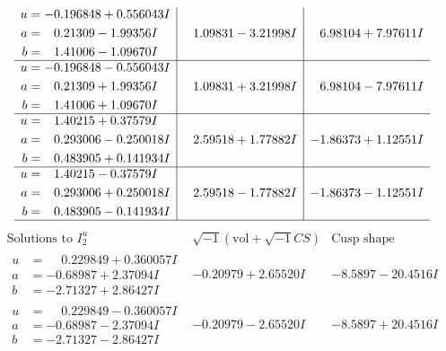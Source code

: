 \documentclass[1p]{elsarticle_modified}
\theoremstyle{definition}
\newcommand{\I}{\sqrt{-1}}
\begin{document}
$$\begin{array}{c|c|c}
\begin{aligned}
u &= -0.196848 + 0.556043 I \\
a &= \phantom{-}0.21309 - 1.99356 I \\
b &= \phantom{-}1.41006 - 1.09670 I\end{aligned}
 & \phantom{-}1.09831 - 3.21998 I & \phantom{-}6.98104 + 7.97611 I \\ \hline\begin{aligned}
u &= -0.196848 - 0.556043 I \\
a &= \phantom{-}0.21309 + 1.99356 I \\
b &= \phantom{-}1.41006 + 1.09670 I\end{aligned}
 & \phantom{-}1.09831 + 3.21998 I & \phantom{-}6.98104 - 7.97611 I \\ \hline\begin{aligned}
u &= \phantom{-}1.40215 + 0.37579 I \\
a &= \phantom{-}0.293006 - 0.250018 I \\
b &= \phantom{-}0.483905 + 0.141934 I\end{aligned}
 & \phantom{-}2.59518 + 1.77882 I & -1.86373 + 1.12551 I \\ \hline\begin{aligned}
u &= \phantom{-}1.40215 - 0.37579 I \\
a &= \phantom{-}0.293006 + 0.250018 I \\
b &= \phantom{-}0.483905 - 0.141934 I\end{aligned}
 & \phantom{-}2.59518 - 1.77882 I & -1.86373 - 1.12551 I\\
 \hline 
 \end{array}$$\newpage$$\begin{array}{c|c|c}  
\text{Solutions to }I^u_{2}& \I (\text{vol} + \sqrt{-1}CS) & \text{Cusp shape}\\
 \hline 
\begin{aligned}
u &= \phantom{-}0.229849 + 0.360057 I \\
a &= -0.68987 + 2.37094 I \\
b &= -2.71327 + 2.86427 I\end{aligned}
 & -0.20979 + 2.65520 I & -8.5897 - 20.4516 I \\ \hline\begin{aligned}
u &= \phantom{-}0.229849 - 0.360057 I \\
a &= -0.68987 - 2.37094 I \\
b &= -2.71327 - 2.86427 I\end{aligned}
 & -0.20979 - 2.65520 I & -8.5897 + 20.4516 I \\ \hline\begin{aligned}

\end{aligned}
\end{array}$$
\end{document}
